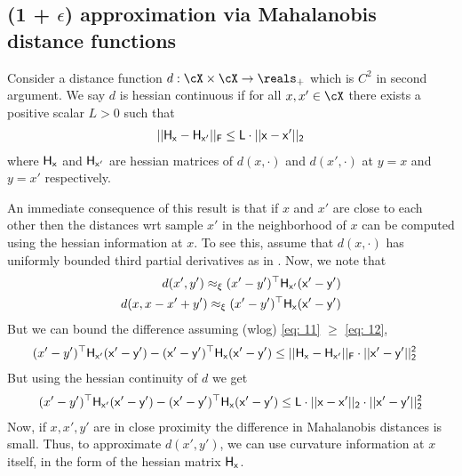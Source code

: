 \subsection{(1 + $\epsilon$) approximation via Mahalanobis distance functions}

\begin{assumption} Consider a distance function $d: \cX \times \cX \to \reals_{+}$ which is $C^2$ in second argument. We say $d$ is hessian continuous if for all $x, x' \in \cX$ there exists a positive scalar $L > 0$ such that 
\begin{align*}
    ||\sf{H}_x - \sf{H}_{x'}||_{F} \le L\cdot ||x - x'||_2
\end{align*}
where $\sf{H}_x$ and $\sf{H}_{x'}$ are hessian matrices of $d(x,\cdot)$ and $d(x',\cdot)$ at $y = x$ and $y = x'$ respectively.
\end{assumption}

An immediate consequence of this result is that if $x$ and $x'$ are close to each other then the distances wrt sample $x'$ in the neighborhood of $x$ can be computed using the hessian information at $x$. To see this, assume that $d(x, \cdot)$ has uniformly bounded third partial derivatives as in . Now, we note that 
\begin{align}
    d(x', y') \approx_{\xi} (x' - y')^{\top}\sf{H}_{x'}(x' - y') \label{eq: 11}\\
    d(x, x - x' + y') \approx_{\xi} (x' - y')^{\top}\sf{H}_{x}(x' - y') \label{eq: 12}
\end{align}
But we can bound the difference assuming (wlog) \eqref{eq: 11} $\ge$ \eqref{eq: 12},
\begin{align*}
    (x' - y')^{\top}\sf{H}_{x'}(x' - y') - (x' - y')^{\top}\sf{H}_{x}(x' - y') &\le ||\sf{H}_x - \sf{H}_{x'}||_{F}\cdot ||x' -y'||^2_2%
\end{align*}
But using the hessian continuity of $d$ we get 
\begin{align*}
    (x' - y')^{\top}\sf{H}_{x'}(x' - y') - (x' - y')^{\top}\sf{H}_{x}(x' - y') \le L\cdot ||x - x'||_2\cdot ||x' -y'||^2_2 \label{eq: mahaapp}
\end{align*}
Now, if $x, x', y'$ are in close proximity the difference in Mahalanobis distances is small. Thus, to approximate $d(x', y')$, we can use curvature information at $x$ itself, in the form of the hessian matrix $\sf{H}_x$.

